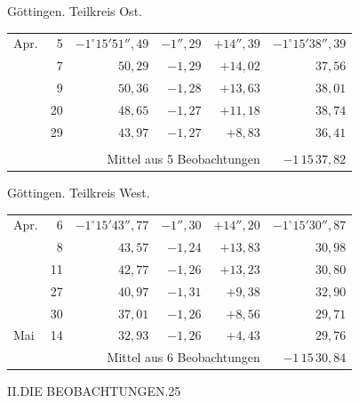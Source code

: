 \noindent\begin{minipage}[t]{.495\textwidth}\centering Göttingen. Teilkreis Ost.\par\smallskip
{\scriptsize\setlength{\tabcolsep}{1pt}\renewcommand{\arraystretch}{1.2}\begin{tabular}{lr|r|r|r|r|}
Apr.&5&$-1^\circ15'51''{,}49$&$-1''{,}29$&$+14''{,}39$&$-1^\circ15'38''{,}39$\\
&7&$50{,}29$&$-1{,}29$&$+14{,}02$&$37{,}56$\\
&9&$50{,}36$&$-1{,}28$&$+13{,}63$&$38{,}01$\\
&20&$48{,}65$&$-1{,}27$&$+11{,}18$&$38{,}74$\\
&29&$43{,}97$&$-1{,}27$&$+8{,}83$&$36{,}41$\\
&&&&&\\
\cline{6-6}\multicolumn{5}{r}{Mittel aus 5 Beobachtungen}&$-1\,15\,37{,}82$
\end{tabular}}\end{minipage}\hfill\begin{minipage}[t]{.495\textwidth}\centering Göttingen. Teilkreis West.\par\smallskip
{\scriptsize\setlength{\tabcolsep}{1pt}\renewcommand{\arraystretch}{1.2}\begin{tabular}{lr|r|r|r|r}
Apr.&6&$-1^\circ15'43''{,}77$&$-1''{,}30$&$+14''{,}20$&$-1^\circ15'30''{,}87$\\
&8&$43{,}57$&$-1{,}24$&$+13{,}83$&$30{,}98$\\
&11&$42{,}77$&$-1{,}26$&$+13{,}23$&$30{,}80$\\
&27&$40{,}97$&$-1{,}31$&$+9{,}38$&$32{,}90$\\
&30&$37{,}01$&$-1{,}26$&$+8{,}56$&$29{,}71$\\
Mai&14&$32{,}93$&$-1{,}26$&$+4{,}43$&$29{,}76$\\
\cline{6-6}\multicolumn{5}{r}{Mittel aus 6 Beobachtungen}&$-1\,15\,30{,}84$
\end{tabular}}\end{minipage}
\par\vspace{4mm}

\clearpage
\noindent\mbox{}\hfill II.\quad DIE BEOBACHTUNGEN.\hfill 25\par

